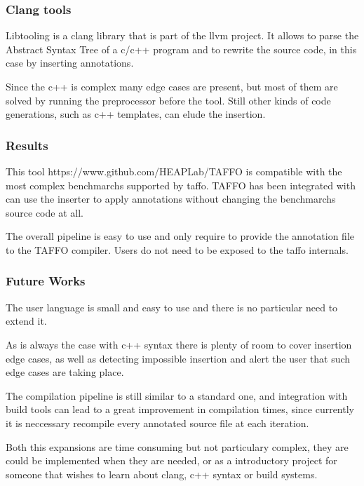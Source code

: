 \documentclass{beamer}
\begin{document}
\begin{frame}[fragile]
	\frametitle{Clang tools}
	\begin{block}{}
		Libtooling is a clang library that is part of the llvm project. It allows to parse the Abstract Syntax Tree of a c/c++ program and to rewrite the source code, in this case by inserting annotations. 
	\end{block}

	\begin{block}{}
		Since the c++ is complex many edge cases are present, but most of them are solved by running the preprocessor before the tool. Still other kinds of code generations, such as c++ templates, can elude the insertion.
	\end{block}
	

\end{frame}
\begin{frame}[fragile]
	\frametitle{Results}
	\begin{block}{}
		This tool https://www.github.com/HEAPLab/TAFFO is compatible with the most complex benchmarchs supported by taffo. TAFFO has been integrated with can use the inserter to apply annotations without changing the benchmarchs source code at all.
	\end{block}
	\begin{block}{}
		The overall pipeline is easy to use and only require to provide the annotation file to the TAFFO compiler. Users do not need to be exposed to the taffo internals.
	\end{block}


\end{frame}

\begin{frame}[fragile]
	\frametitle{Future Works}
	\begin{block}{}
		The user language is small and easy to use and there is no particular need to extend it.
	\end{block}
	\begin{block}{}
		As is always the case with c++ syntax there is plenty of room to cover insertion edge cases, as well as detecting impossible insertion and alert the user that such edge cases are taking place. 
	\end{block}
	\begin{block}{}
		The compilation pipeline is still similar to a standard one, and integration with build tools can lead to a great improvement in compilation times, since currently it is neccessary recompile every annotated source file at each iteration.
	\end{block}
	\begin{block}{}
		Both this expansions are time consuming but not particulary complex, they are could be implemented when they are needed, or as a introductory project for someone that wishes to learn about clang, c++ syntax or build systems.
	\end{block}
\end{frame}
\end{document}
